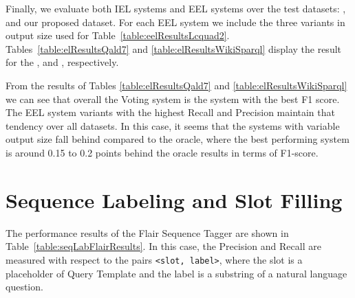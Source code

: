 Finally, we evaluate both IEL systems and EEL systems over the test datasets: \QALDseven{}, and our 
proposed \WikiSPARQL{} dataset. For each EEL system we include the three variants in output size
used for Table~\ref{table:eelResultsLcquad2}. Tables~\ref{table:elResultsQald7} and \ref{table:elResultsWikiSparql} 
display the result for the \QALDseven{}, and \WikiSPARQL{}, respectively.

From the results of Tables \ref{table:elResultsQald7} and \ref{table:elResultsWikiSparql} we can 
see that overall the Voting system is the system with the best F1 score. The EEL system variants 
with the highest Recall and Precision maintain that tendency over all datasets. In this case, it 
seems that the systems with variable output size fall behind compared to the oracle, where the 
best performing system is around 0.15 to 0.2 points behind the oracle results in terms of F1-score. 

\section{Sequence Labeling and Slot Filling}
\label{cap5:results/seqLabSlotFilling}

The performance results of the Flair Sequence Tagger are shown in Table~\ref{table:seqLabFlairResults}. 
In this case, the Precision and Recall are measured with respect to the pairs \texttt{<slot, label>}, 
where the slot is a placeholder of Query Template and the label is a substring of a natural 
language question.

